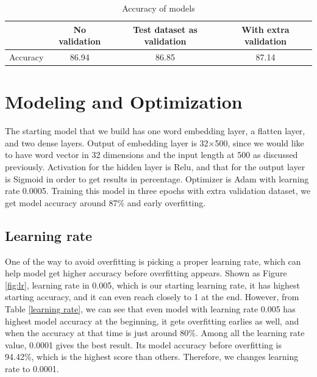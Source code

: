 \documentclass{article}
\begin{document}
 \FloatBarrier
\begin{table}[htb]
\centering
\caption{Accuracy of models}
	\begin{tabular}{||c c c c ||} 
	 \hline
 	&No validation & Test dataset as validation& With extra validation \\ [0.5ex] 
 	\hline\hline
 	 Accuracy& 86.94 & 86.85 & 87.14 \\ 
 	\hline
	\end{tabular}
\label{accuracy validation}
\end{table}
\FloatBarrier

\section{Modeling and Optimization}
The starting model that we build has one word embedding layer, a flatten layer, and two dense layers. Output of embedding layer is 32×500, since we would like to have word vector in 32 dimensions and the input length at 500 as discussed previously. Activation for the hidden layer is Relu, and that for the output layer is Sigmoid in order to get results in percentage. Optimizer is Adam with learning rate 0.0005. Training this model in three epochs with extra validation dataset, we get model accuracy around 87\% and early overfitting. 
\subsection{Learning rate}
One of the way to avoid overfitting is picking a proper learning rate, which can help model get higher accuracy before overfitting appears. Shown as Figure \ref{fig:lr}, learning rate in 0.005, which is our starting learning rate, it has highest starting accuracy, and it can even reach closely to 1 at the end. However, from Table \ref{learning rate}, we can see that even model with learning rate 0.005 has highest model accuracy at the beginning, it gets overfitting earlies as well, and  when the accuracy at that time is just around 80\%. Among all the learning rate value, 0.0001 gives the best result. Its model accuracy  before overfitting is 94.42\%, which is the highest score than others. Therefore, we changes learning rate to 0.0001.
\end{document}
